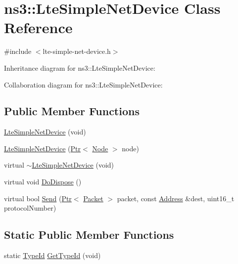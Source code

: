 \hypertarget{classns3_1_1LteSimpleNetDevice}{}\section{ns3\+:\+:Lte\+Simple\+Net\+Device Class Reference}
\label{classns3_1_1LteSimpleNetDevice}


{\ttfamily \#include $<$lte-\/simple-\/net-\/device.\+h$>$}



Inheritance diagram for ns3\+:\+:Lte\+Simple\+Net\+Device\+:


Collaboration diagram for ns3\+:\+:Lte\+Simple\+Net\+Device\+:
\subsection*{Public Member Functions}
\begin{DoxyCompactItemize}
\item 
\hyperlink{classns3_1_1LteSimpleNetDevice_a6b018ed70a8644a2d1d88e6e5940299c}{Lte\+Simple\+Net\+Device} (void)
\item 
\hyperlink{classns3_1_1LteSimpleNetDevice_acbf4ed212d77452d28eeddd9f738cc93}{Lte\+Simple\+Net\+Device} (\hyperlink{classns3_1_1Ptr}{Ptr}$<$ \hyperlink{classns3_1_1Node}{Node} $>$ node)
\item 
virtual \hyperlink{classns3_1_1LteSimpleNetDevice_a910d8885daff3def73ab0149849314dc}{$\sim$\+Lte\+Simple\+Net\+Device} (void)
\item 
virtual void \hyperlink{classns3_1_1LteSimpleNetDevice_a17aab870134e5a6c8a8bca6f9767c559}{Do\+Dispose} ()
\item 
virtual bool \hyperlink{classns3_1_1LteSimpleNetDevice_a457313c324927ada27a18bf6ead9082c}{Send} (\hyperlink{classns3_1_1Ptr}{Ptr}$<$ \hyperlink{classns3_1_1Packet}{Packet} $>$ packet, const \hyperlink{classns3_1_1Address}{Address} \&dest, uint16\+\_\+t protocol\+Number)
\end{DoxyCompactItemize}
\subsection*{Static Public Member Functions}
\begin{DoxyCompactItemize}
\item 
static \hyperlink{classns3_1_1TypeId}{Type\+Id} \hyperlink{classns3_1_1LteSimpleNetDevice_a4643117dd4ed982476278e7d1a45e670}{Get\+Type\+Id} (void)
\end{DoxyCompactItemize}
